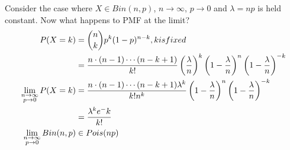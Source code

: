 \begin{slide}%
Consider the case where $X\in Bin(n,p)$, $n\to \infty$, $p\to 0$ and $\lambda = np$ is held constant. Now what happens to PMF at the limit?
\begin{align*}
P(X=k) &= {n \choose k}p^k(1-p)^{n-k}, k is fixed\\
 &= {n\cdot{}(n-1)\cdots{}(n-k+1) \over k!}   \left({\lambda \over n}\right)^k\left(1-{\lambda \over n}\right)^n\left(1-{\lambda \over n}\right)^{-k}\\
\lim_{\substack{n\to\infty\\ p\to 0}} P(X=k) &= {n\cdot{}(n-1)\cdots{}(n-k+1)\lambda^k \over k!n^k}\left(1-{\lambda \over n}\right)^n\left(1-{\lambda \over n}\right)^{-k}\\
&={\lambda^ke^-k \over k!}\\
\lim_{\substack{n\to\infty\\ p\to 0}} Bin(n,p)&\in Pois(np) 
\end{align*}
\end{slide}%


